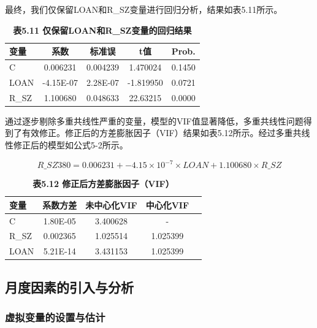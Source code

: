 \documentclass[12pt, a4paper]{article}
\numberwithin{equation}{section}
\begin{document}
最终，我们仅保留LOAN和R\_SZ变量进行回归分析，结果如表5.11所示。

\begin{table}[h!]
    \centering
    \captionsetup{labelformat=empty}
    \caption{\textbf{\fontsize{9pt}{11pt}\selectfont 表5.11 仅保留LOAN和R\_SZ变量的回归结果}}
    \begin{tabular}{lcccc}
        \toprule
        变量    & 系数        & 标准误      & t值        & Prob.  \\
        \midrule
        C     & 0.006231  & 0.004239 & 1.470024  & 0.1450 \\
        LOAN  & -4.15E-07 & 2.28E-07 & -1.819950 & 0.0721 \\
        R\_SZ & 1.100680  & 0.048633 & 22.63215  & 0.0000 \\
        \bottomrule
    \end{tabular}
\end{table}

通过逐步剔除多重共线性严重的变量，模型的VIF值显著降低，多重共线性问题得到了有效修正。修正后的方差膨胀因子（VIF）结果如表5.12所示。经过多重共线性修正后的模型如公式5-2所示。

\begin{equation}
    R\_SZ380 = 0.006231 + -4.15\times 10 ^ {-7} \times LOAN + 1.100680 \times R\_SZ
    \tag{5-2}
\end{equation}

\begin{table}[h!]
    \centering
    \captionsetup{labelformat=empty}
    \caption{\textbf{\fontsize{9pt}{11pt}\selectfont 表5.12 修正后方差膨胀因子（VIF）}}
    \begin{tabular}{lcccc}
        \toprule
        变量    & 系数方差     & 未中心化VIF  & 中心化VIF   \\
        \midrule
        C     & 1.80E-05 & 3.400628 & -        \\
        R\_SZ & 0.002365 & 1.025514 & 1.025399 \\
        LOAN  & 5.21E-14 & 3.431153 & 1.025399 \\
        \bottomrule
    \end{tabular}
\end{table}


\subsection{月度因素的引入与分析}
\subsubsection{虚拟变量的设置与估计}
\end{document}
